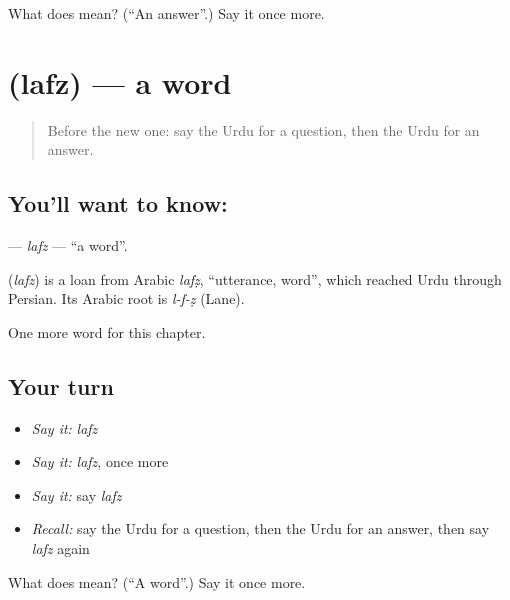 \begin{tcolorbox}[breakable,colback=teal!4,colframe=teal!35!black,title={Before you move on}]
What does  mean? (\textquotedblleft{}An answer\textquotedblright{}.) Say it once more.
\end{tcolorbox}
\section[\texorpdfstring{\ur{لفظ} (lafz)}{لفظ (lafz)}]{ (lafz) — a word}

\label{lesson:UR-C63-lafz}



\begin{quote}
Before the new one: say the Urdu for a question, then the Urdu for an answer.
\end{quote}

\subsection*{You'll want to know: }
\textbf{} — \emph{lafz} — \textquotedblleft{}a word\textquotedblright{}.

\begin{cousinweb}
\textbf{} (\emph{lafz}) is a loan from Arabic \emph{lafẓ}, \textquotedblleft{}utterance, word\textquotedblright{}, which reached Urdu through Persian. Its Arabic root is \emph{l-f-ẓ} (Lane).
\end{cousinweb}

\begin{grammarlens}[title={What you've built}]
One more word for this chapter.
\end{grammarlens}

\subsection*{Your turn}
\begin{itemize}
\raggedright
  \item \emph{Say it:} \emph{lafz}
  \item \emph{Say it:} \emph{lafz}, once more
  \item \emph{Say it:} say \emph{lafz}
  \item \emph{Recall:} say the Urdu for a question, then the Urdu for an answer, then say \emph{lafz} again
\end{itemize}

\begin{tcolorbox}[breakable,colback=teal!4,colframe=teal!35!black,title={Before you move on}]
What does  mean? (\textquotedblleft{}A word\textquotedblright{}.) Say it once more.
\end{tcolorbox}
